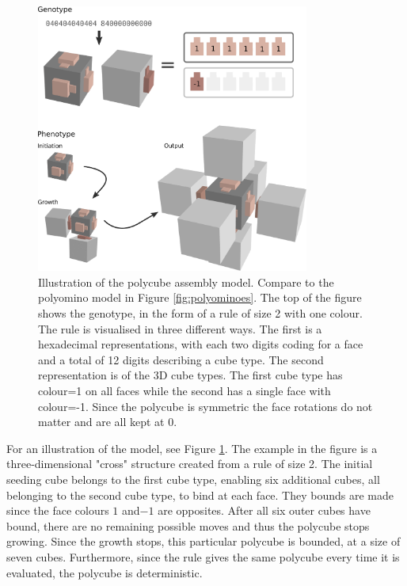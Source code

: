 \begin{figure}
\centering\includegraphics[width=0.8\textwidth]{figures/rule.eps} 
\caption{Illustration of the polycube assembly model. Compare to the polyomino model in Figure \ref{fig:polyominoes}. The top of the figure shows the genotype, in the form of a rule of size 2 with one colour. The rule is visualised in three different ways. The first is a hexadecimal representations, with each two digits coding for a face and a total of 12 digits describing a cube type. The second representation is of the 3D cube types. The first cube type has colour=1 on all faces while the second has a single face with colour=-1. Since the polycube is symmetric the face rotations do not matter and are all kept at 0.}
\label{fig:polycubeRule}\end{figure}

For an illustration of the model, see Figure \ref{fig:polycubeRule}. The example in the figure is a three-dimensional "cross" structure created from a rule of size 2. The initial seeding cube belongs to the first cube type, enabling six additional cubes, all belonging to the second cube type, to bind at each face. They bounds are made since the face colours \(1\) and\( -1\) are opposites. After all six outer cubes have bound, there are no remaining possible moves and thus the polycube stops growing. Since the growth stops, this particular polycube is bounded, at a size of seven cubes. Furthermore, since the rule gives the same polycube every time it is evaluated, the polycube is deterministic.


